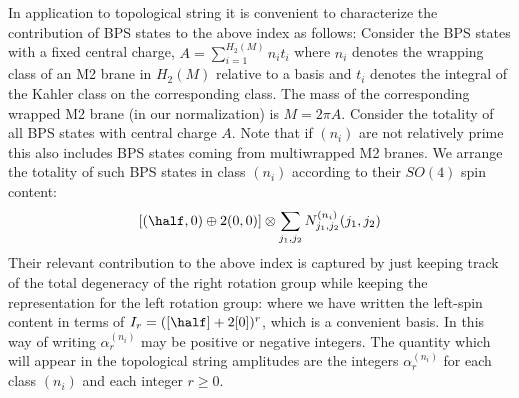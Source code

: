 In application to topological string it is convenient
to characterize the contribution of BPS states to the above index
as follows:
Consider the BPS states with
a fixed central charge, $A=\sum_{i=1}^{H_2(M)} n_it_i$ where
$n_i$ denotes the wrapping class of an M2 brane in $H_2(M)$ relative to a basis
and $t_i$ denotes the integral of the Kahler class on the corresponding
class.  The mass of the corresponding wrapped M2 brane (in our normalization)
is $M=2\pi A$.  Consider the totality of all BPS states
with central charge $A$.  Note that if $(n_i)$ are not relatively
prime this also includes BPS states coming from multiwrapped M2 branes.
We arrange the totality of such BPS states in class
$(n_i)$ according to their $SO(4)$ spin
content:
%
$$[(\half ,0)\oplus 2(0,0)]\otimes \sum_{j_1,j_2}
N^{(n_i)}_{j_1,j_2}(j_1,j_2)$$
%
Their relevant contribution to the above index is captured by just
keeping track of the total degeneracy of the right rotation group
while keeping the representation for the left rotation group:
%
\eqn{}
%
where we have written the left-spin content
in terms of $I_r=([\half]+2[0])^r$, which is a
convenient basis.  In this way of writing $\alpha^{(n_i)}_r$ may be
positive or negative integers.
  The quantity which will appear
in the topological string amplitudes are the integers
$\alpha^{(n_i)}_r$ for each class $(n_i)$ and each integer
$r\geq 0$.

